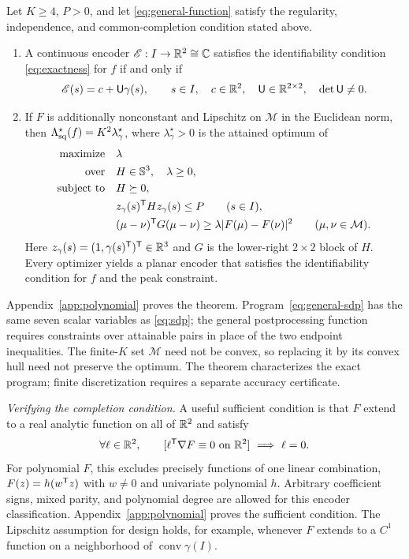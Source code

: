 \begin{theorem}
\label{thm:extension}\label{thm:polynomial}
Let $K\ge4$, $P>0$, and let \eqref{eq:general-function} satisfy the regularity, independence, and common-completion condition stated above.
\begin{enumerate}
\item A continuous encoder $\mathscr E:I\to\mathbb R^2\cong\mathbb C$ satisfies the identifiability condition \eqref{eq:exactness} for $f$ if and only if
$$
 \mathscr E(s)=c+\mathsf U\gamma(s),\qquad s\in I,\quad
 c\in\mathbb R^2,\quad\mathsf U\in\mathbb R^{2\times2},\quad\det\mathsf U\ne0.
$$
\item If $F$ is additionally nonconstant and Lipschitz on $\mathcal M$ in the Euclidean norm, then $\Lambda_{\mathrm{sq}}^\star(f)=K^2\lambda_\gamma^\star$, where $\lambda_\gamma^\star>0$ is the attained optimum of
\begin{equation}
\begin{aligned}
 \text{maximize}\quad &\lambda\\
 \text{over}\quad &H\in\mathbb S^3,\quad\lambda\ge0,\\
 \text{subject to}\quad &H\succeq0,\\
 &z_\gamma(s)^\mathsf T H z_\gamma(s)\le P\qquad(s\in I),\\
 &(\mu-\nu)^\mathsf T G(\mu-\nu)\ge\lambda|F(\mu)-F(\nu)|^2
       \qquad(\mu,\nu\in\mathcal M).
\end{aligned}
 \label{eq:general-sdp}
\end{equation}
Here $z_\gamma(s)=(1,\gamma(s)^\mathsf T)^\mathsf T\in\mathbb R^3$ and $G$ is the lower-right $2\times2$ block of $H$. Every optimizer yields a planar encoder that satisfies the identifiability condition for $f$ and the peak constraint.
\end{enumerate}
\end{theorem}
Appendix~\ref{app:polynomial} proves the theorem. Program~\eqref{eq:general-sdp} has the same seven scalar variables as \eqref{eq:sdp}; the general postprocessing function requires constraints over attainable pairs in place of the two endpoint inequalities. The finite-$K$ set $\mathcal M$ need not be convex, so replacing it by its convex hull need not preserve the optimum. The theorem characterizes the exact program; finite discretization requires a separate accuracy certificate.

\emph{Verifying the completion condition.} A useful sufficient condition is that $F$ extend to a real analytic function on all of $\mathbb R^2$ and satisfy
\begin{equation}
 \forall\ell\in\mathbb R^2,\qquad
 [\ell^\mathsf T\nabla F\equiv0\text{ on }\mathbb R^2]\ \Longrightarrow\ \ell=0.
 \label{eq:analytic-nondegenerate}
\end{equation}
For polynomial $F$, this excludes precisely functions of one linear combination, $F(z)=h(w^\mathsf T z)$ with $w\ne0$ and univariate polynomial $h$. Arbitrary coefficient signs, mixed parity, and polynomial degree are allowed for this encoder classification. Appendix~\ref{app:polynomial} proves the sufficient condition. The Lipschitz assumption for design holds, for example, whenever $F$ extends to a $C^1$ function on a neighborhood of $\operatorname{conv}\gamma(I)$.

